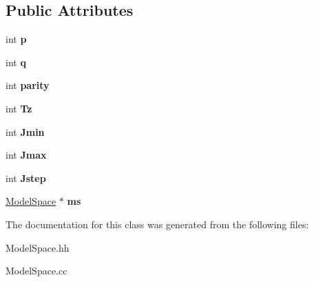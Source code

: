 \subsection*{Public Attributes}
\begin{DoxyCompactItemize}
\item 
\hypertarget{classKet_a3120fbd6d28583a0e06d6426e0e69c83}{int {\bfseries p}}\label{classKet_a3120fbd6d28583a0e06d6426e0e69c83}

\item 
\hypertarget{classKet_afd050bca27dacccd2637266804b4d710}{int {\bfseries q}}\label{classKet_afd050bca27dacccd2637266804b4d710}

\item 
\hypertarget{classKet_a4a0681d5510440adda8a1b8381cf9152}{int {\bfseries parity}}\label{classKet_a4a0681d5510440adda8a1b8381cf9152}

\item 
\hypertarget{classKet_ab5dfa76647fc103d1c97ae349a6353e7}{int {\bfseries Tz}}\label{classKet_ab5dfa76647fc103d1c97ae349a6353e7}

\item 
\hypertarget{classKet_ae042513fd7d35c7edd185d86ef961a00}{int {\bfseries Jmin}}\label{classKet_ae042513fd7d35c7edd185d86ef961a00}

\item 
\hypertarget{classKet_a9ef8bcb06beb06198fc12d194e7a379e}{int {\bfseries Jmax}}\label{classKet_a9ef8bcb06beb06198fc12d194e7a379e}

\item 
\hypertarget{classKet_a81376ef212f38628ad2aa913825052f3}{int {\bfseries Jstep}}\label{classKet_a81376ef212f38628ad2aa913825052f3}

\item 
\hypertarget{classKet_ab9e32bf8c16c7ce422e9a1c9ffe2a9fd}{\hyperlink{classModelSpace}{Model\-Space} $\ast$ {\bfseries ms}}\label{classKet_ab9e32bf8c16c7ce422e9a1c9ffe2a9fd}

\end{DoxyCompactItemize}


The documentation for this class was generated from the following files\-:\begin{DoxyCompactItemize}
\item 
Model\-Space.\-hh\item 
Model\-Space.\-cc\end{DoxyCompactItemize}
